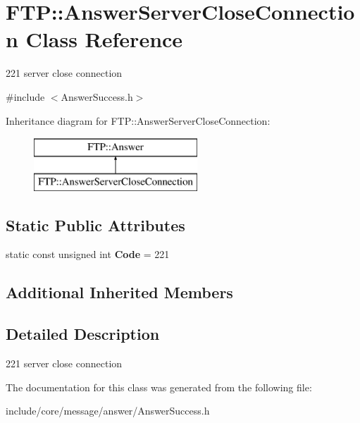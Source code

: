 \hypertarget{class_f_t_p_1_1_answer_server_close_connection}{\section{F\-T\-P\-:\-:Answer\-Server\-Close\-Connection Class Reference}
\label{class_f_t_p_1_1_answer_server_close_connection}
}


221 server close connection  




{\ttfamily \#include $<$Answer\-Success.\-h$>$}

Inheritance diagram for F\-T\-P\-:\-:Answer\-Server\-Close\-Connection\-:\begin{figure}[H]
\begin{center}
\leavevmode
\includegraphics[height=2.000000cm]{class_f_t_p_1_1_answer_server_close_connection}
\end{center}
\end{figure}
\subsection*{Static Public Attributes}
\begin{DoxyCompactItemize}
\item 
\hypertarget{class_f_t_p_1_1_answer_server_close_connection_a84a59678802f8cb1a193b407e05b6814}{static const unsigned int {\bfseries Code} = 221}\label{class_f_t_p_1_1_answer_server_close_connection_a84a59678802f8cb1a193b407e05b6814}

\end{DoxyCompactItemize}
\subsection*{Additional Inherited Members}


\subsection{Detailed Description}
221 server close connection 

The documentation for this class was generated from the following file\-:\begin{DoxyCompactItemize}
\item 
include/core/message/answer/Answer\-Success.\-h\end{DoxyCompactItemize}
